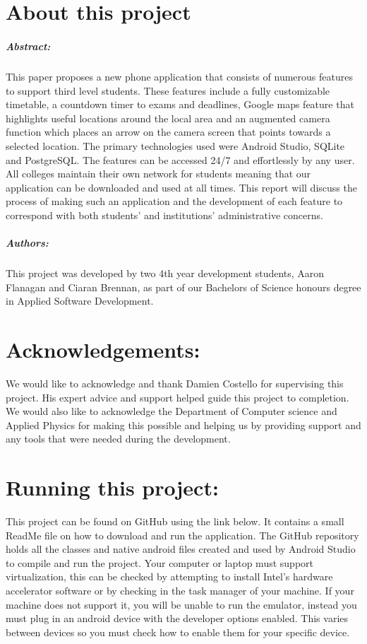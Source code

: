 
\chapter*{About this project}
\paragraph{Abstract:}
This paper proposes a new phone application that consists of numerous features to support third level students. These features include a fully customizable timetable, a countdown timer to exams and deadlines, Google maps feature that highlights useful locations around the local area and an augmented camera function which places an arrow on the camera screen that points towards a selected location.  The primary technologies used were Android Studio, SQLite and PostgreSQL. The features can be accessed 24/7 and effortlessly by any user. All colleges maintain their own network for students meaning that our application can be downloaded and used at all times. This report will discuss the process of making such an application and the development of each feature to correspond with both students’ and institutions’ administrative concerns.
 
\paragraph{Authors:}
This project was developed by two 4th year development students, Aaron Flanagan and Ciaran Brennan, as part of our Bachelors of Science honours degree in Applied Software Development.

\chapter*{Acknowledgements:}
We would like to acknowledge and thank Damien Costello for supervising this project. His expert advice and support helped guide this project to completion. We would also like to acknowledge the Department of Computer science and Applied Physics for making this possible and helping us by providing support and any tools that were needed during the development.

\chapter*{Running this project:}
This project can be found on GitHub using the link below.
It contains a small ReadMe file on how to download and run the application. The GitHub repository holds all the classes and native android files created and used by Android Studio to compile and run the project. Your computer or laptop must support virtualization, this can be checked by attempting to install Intel's hardware accelerator software or by checking in the task manager of your machine. If your machine does not support it, you will be unable to run the emulator, instead you must plug in an android device with the developer options enabled. This varies between devices so you must check how to enable them for your specific device.
